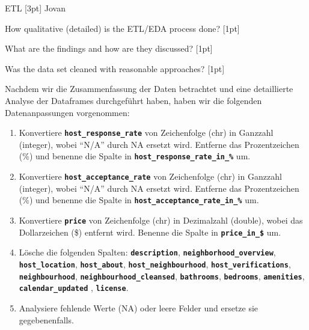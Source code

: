 \documentclass[
  journal,
]{IEEEtran}%
\begin{document}
ETL {[}3pt{]} Jovan

How qualitative (detailed) is the ETL/EDA process done? {[}1pt{]}

What are the findings and how are they discussed? {[}1pt{]}

Was the data set cleaned with reasonable approaches? {[}1pt{]}

Nachdem wir die Zusammenfassung der Daten betrachtet und eine
detaillierte Analyse der Dataframes durchgeführt haben, haben wir die
folgenden Datenanpassungen vorgenommen:

\begin{enumerate}
\def\labelenumi{\arabic{enumi}.}
\item
  Konvertiere \textbf{\texttt{host\_response\_rate}} von Zeichenfolge
  (chr) in Ganzzahl (integer), wobei ``N/A'' durch NA ersetzt wird.
  Entferne das Prozentzeichen (\%) und benenne die Spalte in
  \textbf{\texttt{host\_response\_rate\_in\_\%}} um.
\item
  Konvertiere \textbf{\texttt{host\_acceptance\_rate}} von Zeichenfolge
  (chr) in Ganzzahl (integer), wobei ``N/A'' durch NA ersetzt wird.
  Entferne das Prozentzeichen (\%) und benenne die Spalte in
  \textbf{\texttt{host\_acceptance\_rate\_in\_\%}} um.
\item
  Konvertiere \textbf{\texttt{price}} von Zeichenfolge (chr) in
  Dezimalzahl (double), wobei das Dollarzeichen (\$) entfernt wird.
  Benenne die Spalte in \textbf{\texttt{price\_in\_\$}} um.
\item
  Lösche die folgenden Spalten: \textbf{\texttt{description}},
  \textbf{\texttt{neighborhood\_overview}},
  \textbf{\texttt{host\_location}}, \textbf{\texttt{host\_about}},
  \textbf{\texttt{host\_neighbourhood}},
  \textbf{\texttt{host\_verifications}},
  \textbf{\texttt{neighbourhood}},
  \textbf{\texttt{neighbourhood\_cleansed}},
  \textbf{\texttt{bathrooms}}, \textbf{\texttt{bedrooms}},
  \textbf{\texttt{amenities}}, \textbf{\texttt{calendar\_updated}} ,
  \textbf{\texttt{license}}.
\item
  Analysiere fehlende Werte (NA) oder leere Felder und ersetze sie
  gegebenenfalls.
\end{enumerate}
\end{document}

